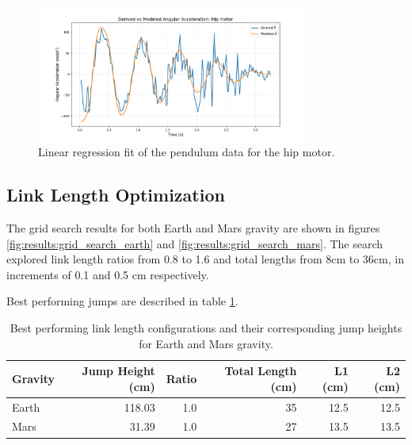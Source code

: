 \begin{figure}[h]
    \centering
    \includegraphics[width=0.8\textwidth]{Images/results/friction_est_hip_motor.png}
    \caption{Linear regression fit of the pendulum data for the hip motor.}
    \label{fig:results:motor_friction_estimation:linear_regression_hip_motor}
\end{figure}




\subsection{Link Length Optimization}
\label{sec:results:link_length_optimization}
The grid search results for both Earth and Mars gravity are shown in figures \ref{fig:results:grid_search_earth} and \ref{fig:results:grid_search_mars}. The search explored link length ratios from 0.8 to 1.6 and total lengths from 8cm to 36cm, in increments of 0.1 and 0.5 cm respectively.

Best performing jumps are described in table \ref{tab:results:grid_search_earth:best_jumps}.
\begin{table}[h]
    \centering
    \begin{tabular}{lrrrrr}
        \hline
        Gravity & Jump Height (cm) & Ratio & Total Length (cm) & L1 (cm) & L2 (cm) \\
        \hline
        Earth & 118.03 & 1.0 & 35 & 12.5 & 12.5 \\
        Mars & 31.39 & 1.0 & 27 & 13.5 & 13.5 \\
        \hline
    \end{tabular}
    \caption{Best performing link length configurations and their corresponding jump heights for Earth and Mars gravity.}
    \label{tab:results:grid_search_earth:best_jumps}
\end{table}


